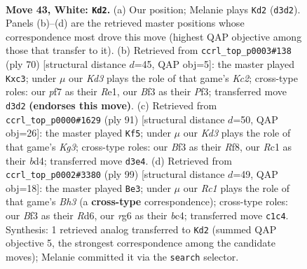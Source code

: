\documentclass[11pt]{article}
\begin{document}
\clearpage

\begin{figure}[p]\centering
\begin{subfigure}{0.46\textwidth}\centering
\resizebox{\linewidth}{!}{%
\newchessgame
\chessboard[
  setfen={3r2k1/5p1p/6r1/pb6/3p2P1/1P1K1B1N/6RP/2R5 w - - 0 43},
  showmover=false,
  pgfstyle=straightmove, color=movearrow, markmove={d3-d2}
]}
\caption{}
\end{subfigure}\hfill
\begin{subfigure}{0.46\textwidth}\centering
\resizebox{\linewidth}{!}{%
\newchessgame
\chessboard[
  setfen={1r5k/4rp1p/2B1n1p1/1P2R3/8/2p2P2/2K4P/4R3 w - - 0 36},
  showmover=false,
  pgfstyle=straightmove, color=movearrow, markmove={c2-c3}
]}
\caption{}
\end{subfigure}
\\[4pt]
\begin{subfigure}{0.46\textwidth}\centering
\resizebox{\linewidth}{!}{%
\newchessgame
\chessboard[
  setfen={5r2/8/3PRpk1/7p/3B4/b1R2Pp1/4K1P1/1r6 b - - 2 46},
  showmover=false,
  pgfstyle=straightmove, color=movearrow, markmove={g6-f5}
]}
\caption{}
\end{subfigure}\hfill
\begin{subfigure}{0.46\textwidth}\centering
\resizebox{\linewidth}{!}{%
\newchessgame
\chessboard[
  setfen={6k1/1r3p2/3r3b/p7/P1Bp4/5RP1/1P2R1K1/8 b - - 20 50},
  showmover=false,
  pgfstyle=straightmove, color=movearrow, markmove={h6-e3}
]}
\caption{}
\end{subfigure}
\caption{\textbf{Move 43, White: \texttt{Kd2}.} (a) Our position; Melanie plays \texttt{Kd2} (\texttt{d3d2}). Panels (b)--(d) are the retrieved master positions whose correspondence most drove this move (highest QAP objective among those that transfer to it). (b) Retrieved from \texttt{ccrl\_top\_p0003\#138} (ply 70) [structural distance $d$=45, QAP obj=5]: the master played \texttt{Kxc3}; under $\mu$ our \emph{Kd3} plays the role of that game's \emph{Kc2}; cross-type roles: our \emph{p}f7 as their \emph{R}e1, our \emph{B}f3 as their \emph{P}f3; transferred move \texttt{d3d2} \textbf{(endorses this move)}. (c) Retrieved from \texttt{ccrl\_top\_p0000\#1629} (ply 91) [structural distance $d$=50, QAP obj=26]: the master played \texttt{Kf5}; under $\mu$ our \emph{Kd3} plays the role of that game's \emph{Kg3}; cross-type roles: our \emph{B}f3 as their \emph{R}f8, our \emph{R}c1 as their \emph{b}d4; transferred move \texttt{d3e4}. (d) Retrieved from \texttt{ccrl\_top\_p0002\#3380} (ply 99) [structural distance $d$=49, QAP obj=18]: the master played \texttt{Be3}; under $\mu$ our \emph{Rc1} plays the role of that game's \emph{Bh3} (a \textbf{cross-type} correspondence); cross-type roles: our \emph{B}f3 as their \emph{R}d6, our \emph{r}g6 as their \emph{b}c4; transferred move \texttt{c1c4}. Synthesis: 1 retrieved analog transferred to \texttt{Kd2} (summed QAP objective 5, the strongest correspondence among the candidate moves); Melanie committed it via the \texttt{search} selector.}
\label{fig:thought-m84}
\end{figure}
\end{document}
